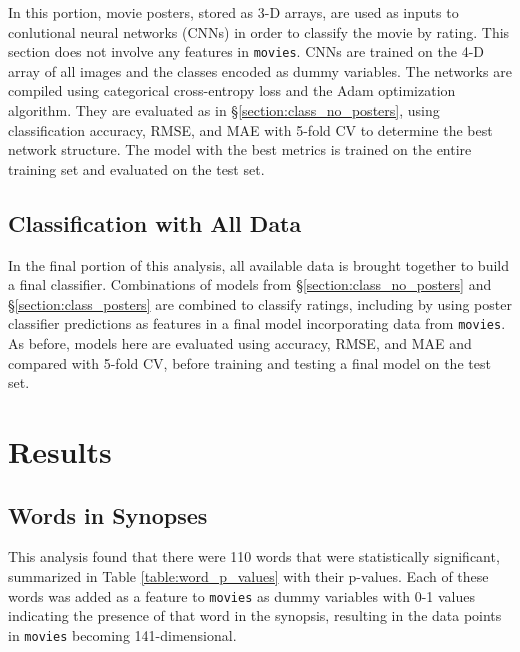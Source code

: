 \documentclass[12pt, oneside]{article}   	%
\begin{document}
In this portion, movie posters, stored as 3-D arrays, are used as inputs to conlutional neural networks (CNNs) in order to classify the movie by rating. This section does not involve any features in \texttt{movies}. CNNs are trained on the 4-D array of all images and the classes encoded as dummy variables. The networks are compiled using categorical cross-entropy loss and the Adam optimization algorithm. They are evaluated as in \S \ref{section:class_no_posters}, using classification accuracy, RMSE, and MAE with 5-fold CV to determine the best network structure. The model with the best metrics is trained on the entire training set and evaluated on the test set.

\subsection{Classification with All Data}

In the final portion of this analysis, all available data is brought together to build a final classifier. Combinations of models from \S \ref{section:class_no_posters} and \S \ref{section:class_posters} are combined to classify ratings, including by using poster classifier predictions as features in a final model incorporating data from \texttt{movies}. As before, models here are evaluated using accuracy, RMSE, and MAE and compared with 5-fold CV, before training and testing a final model on the test set.

\section{Results}

\subsection{Words in Synopses}
\label{section:words_results}

This analysis found that there were 110 words that were statistically significant, summarized in Table \ref{table:word_p_values} with their p-values. Each of these words was added as a feature to \texttt{movies} as dummy variables with 0-1 values indicating the presence of that word in the synopsis, resulting in the data points in \texttt{movies} becoming 141-dimensional.
\end{document}
